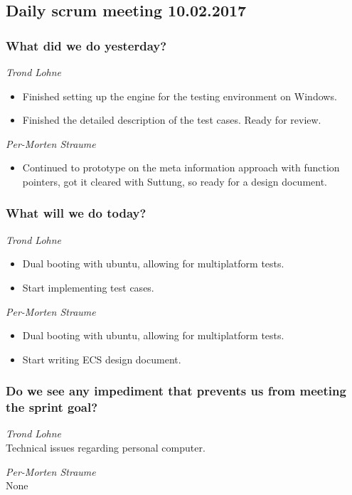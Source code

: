 \documentclass{article}
\begin{document}
\begin{center}
\subsection*{Daily scrum meeting 10.02.2017}
\end{center}
\bigskip


\subsubsection*{What did we do yesterday?}

\noindent\textit{Trond Lohne}
\begin{itemize}
    \item
    Finished setting up the engine for the testing environment on Windows.

    \item
    Finished the detailed description of the test cases. Ready for review.    
\end{itemize}

\medskip

\noindent\textit{Per-Morten Straume}
\begin{itemize}
    \item
    Continued to prototype on the meta information approach with function pointers, got it cleared with Suttung, so ready for a design document.
\end{itemize}


\subsubsection*{What will we do today?}

\noindent\textit{Trond Lohne}
\begin{itemize}
    \item
    Dual booting with ubuntu, allowing for multiplatform tests.

    \item
    Start implementing test cases.
\end{itemize}

\medskip

\noindent\textit{Per-Morten Straume}
\begin{itemize}
    \item
    Dual booting with ubuntu, allowing for multiplatform tests.

    \item
    Start writing ECS design document. 
\end{itemize}

\subsubsection*{Do we see any impediment that prevents us from meeting the sprint goal?}

\noindent\textit{Trond Lohne}\\
Technical issues regarding personal computer.

\medskip

\noindent\textit{Per-Morten Straume}\\
None
\end{document}
